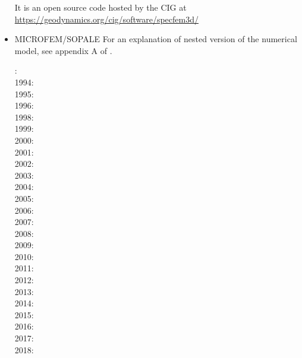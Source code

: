 \begin{itemize}
It is an open source code hosted by the CIG at 
\url{https://geodynamics.org/cig/software/specfem3d/}

{\small
\noindent
\cite{kott05}
}

\item {\codefont MICROFEM}/{\codefont SOPALE} 
For an explanation of nested version of the numerical model, see appendix A of \cite{webe18}.

{\small
{}: \cite{wibf93}\\
1994: \cite{wibe94}\cite{befh94}\cite{bequ94}\\
1995: \cite{full95}\cite{elfb95}\\
1996: \cite{bekh96}\cite{beeh96}\cite{wabe96}\\
1998: \cite{elbj98}\cite{jabf98}\cite{wabb98}\\
1999: \cite{will99a}\cite{will99b}\cite{elbp99}\cite{elbe99}\cite{beep99}\cite{pelj99}\\
2000: \cite{pybf00}\cite{bemh00}\cite{pfeb00}\\
2001: \cite{bejn01}\\
2002: \cite{hube02}\cite{pybf02}\\
2003: \cite{hube03}\cite{vamf03}\cite{wipo03}\cite{pymi03}\cite{bupf03}\cite{wiep03}\\
2004: \cite{bejn04}\cite{pycr04}\cite{pybe04}\cite{elsp04}\cite{geim04}\cite{jabm04}\\
2005: \cite{gebi05}\cite{hubb05}\\
2006: \cite{pysk06}\cite{selz06}\cite{pabs06}\cite{jabn06}\cite{benj06}\cite{cubj06}\\
2007: \cite{hube07}\cite{cubh07}\cite{mohb07}\cite{sebp07}\cite{buto07b}\cite{jabn07}\cite{shpy07}\\
2008: \cite{sebp08}\cite{wabj08}\cite{wabj08b}\cite{gopy08}\cite{buhb08}\cite{hube08}\cite{cuhb08}\\
2009: \cite{kecw09}\cite{bejb09}\cite{bupb09}\cite{grba09}\cite{sihb09}\\
2010: \cite{albs10}\cite{albe10}\cite{grpy10}\cite{pygp10}\cite{albi10}\cite{jabw10}\cite{inbe10}
      \cite{inbe10b}\\
2011: \cite{cube11}\cite{bubj11}\cite{hube11}\cite{jabe11}\\
2012: \cite{grpy12}\cite{grpy12b}\cite{kogp12}\cite{grbe12}\cite{jahu12}\cite{albe12}\cite{grbi12}
      \cite{goib12}\cite{bein12}\\
2013: \cite{bubj13}\cite{chbe13}\cite{fihv13a}\cite{fihv13b}\cite{gobi13}\cite{grpy13}
      \cite{knak13}\cite{nipc13}\cite{krcu13}\\
2014: \cite{gogu14}\cite{jahm14}\cite{hube14}\cite{bubj14}\\
2015: \cite{albe15}\cite{bubj15}\cite{heps15}\cite{cudd15}\\
2016: \cite{licu16}\cite{albe16}\cite{kebb16}\\
2017: \cite{bube17}\cite{grbe17}\\
2018: \cite{webe18}\cite{webe18b}
}


\end{itemize}
